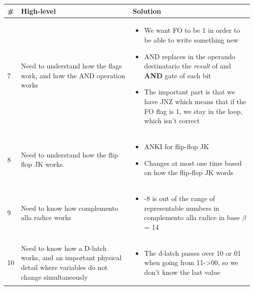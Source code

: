 \documentclass[a4paper,12pt]{article}
\begin{document}
\noindent\hspace*{-1.5cm}
    \begin{tabular}{|C{0.7cm}|C{8cm}|C{8cm}|}
        \hline
        \textbf{\#} & \textbf{High-level} & \textbf{Solution} \\
        \hline
        
        7
        &
        Need to understand how the flags work, and how the AND operation works
        &
         \begin{itemize}[label=\(\rightarrow\)]
            \item We want FO to be 1 in order to be able to write something new
            \item AND replaces in the operando destinatario the \textit{result} of and \textbf{AND} gate of each bit
            \item The important part is that we have JNZ which means that if the FO flag is 1, we stay in the loop, which isn't correct
        \end{itemize}
        \\
        \hline


        8
        &
        Need to understand how the flip flop JK works.
        &
         \begin{itemize}[label=\(\rightarrow\)]
            \item ANKI for flip-flop JK
            \item Changes at most one time based on how the flip-flop JK words
        \end{itemize}
        \\
        \hline
        

        9
        &
        Need to know how complemento alla radice works
        &
         \begin{itemize}[label=\(\rightarrow\)]
            \item -8 is out of the range of representable numbers in complemento alla radice in base $\beta$ = 14
        \end{itemize}
        \\
        \hline


        10
        &
        Need to know how a D-latch works, and an important physical detail where variables do not change simultaneously
        &
         \begin{itemize}[label=\(\rightarrow\)]
            \item The d-latch passes over 10 or 01 when going from 11->00, so we don't know the last value
        \end{itemize}
        \\
        \hline
        
    \end{tabular}
\end{document}
